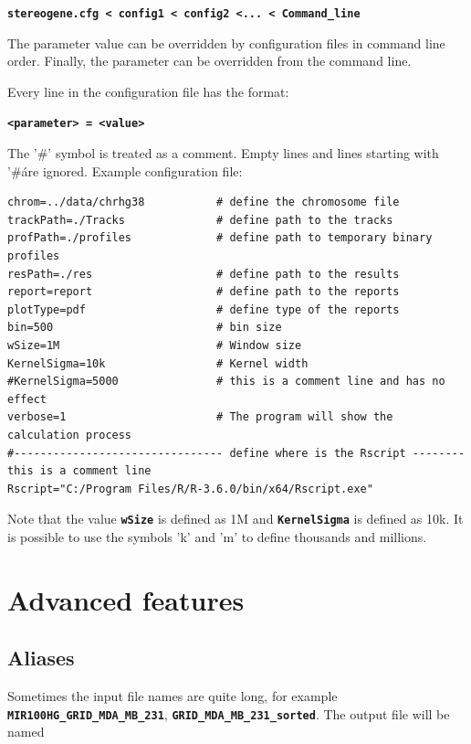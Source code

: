 \documentclass{article}
\newcommand{\prm}[1]{\texttt{\textbf{{#1}}}}
\begin{document}
\begin{center}
\prm{stereogene.cfg < config1 < config2 <... < Command\_line}
\end{center}
The parameter value can be overridden by configuration files in command line order. Finally, the parameter can be overridden from the command line.

Every line in the configuration file has the format:

\begin{center}
\prm{<parameter> = <value>}
\end{center}

The '\#' symbol is treated as a comment. Empty lines and lines starting with '\#\' are ignored. Example configuration file:

\begin{shaded} 
\begin{verbatim}
chrom=../data/chrhg38           # define the chromosome file
trackPath=./Tracks              # define path to the tracks
profPath=./profiles             # define path to temporary binary profiles
resPath=./res                   # define path to the results
report=report                   # define path to the reports
plotType=pdf                    # define type of the reports
bin=500	                        # bin size
wSize=1M                        # Window size
KernelSigma=10k                 # Kernel width
#KernelSigma=5000               # this is a comment line and has no effect
verbose=1                       # The program will show the calculation process
#-------------------------------- define where is the Rscript -------- this is a comment line
Rscript="C:/Program Files/R/R-3.6.0/bin/x64/Rscript.exe"
\end{verbatim}
\end{shaded}
Note that the value \prm{wSize} is defined as 1M and \prm{KernelSigma} is defined as 10k. It is possible to use the symbols 'k' and 'm' to define thousands and millions.


\section{Advanced features}

\subsection{Aliases}\label{aliases}
Sometimes the input file names are quite long, for example \prm{MIR100HG\_GRID\_MDA\_MB\_231}, \prm{GRID\_MDA\_MB\_231\_sorted}. The output file will be named 
\end{document}
